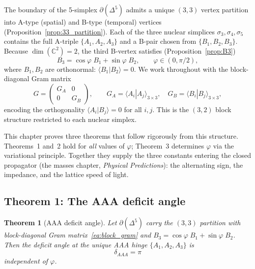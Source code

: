 \documentclass[12pt]{article}
\newtheorem{theorem}{Theorem}[section]
\theoremstyle{remark}
\theoremstyle{definition}
\newcommand{\CC}{\mathbb{C}}
\begin{document}
The boundary of the 5-simplex $\partial(\Delta^5)$ admits a unique
$(3,3)$ vertex partition into A-type (spatial) and B-type (temporal)
vertices (Proposition~\ref{prop:33_partition}).  Each of the three
nuclear simplices $\sigma_3, \sigma_4, \sigma_5$ contains the full
A-triple $\{A_1, A_2, A_3\}$ and a B-pair chosen from
$\{B_1, B_2, B_3\}$.  Because $\dim(\CC^2) = 2$, the third B-vertex
satisfies (Proposition~\ref{prop:B3})
\begin{equation}\label{eq:B3_parametrize}
B_3 = \cos\varphi\; B_1 + \sin\varphi\; B_2,
\qquad \varphi \in (0, \pi/2),
\end{equation}
where $B_1, B_2$ are orthonormal: $\langle B_1 | B_2 \rangle = 0$.
We work throughout with the block-diagonal Gram matrix
\begin{equation}\label{eq:block_gram}
G = \begin{pmatrix} G_A & 0 \\ 0 & G_B \end{pmatrix},
\qquad
G_A = \langle A_i | A_j \rangle_{3\times 3},
\quad
G_B = \langle B_i | B_j \rangle_{3\times 3},
\end{equation}
encoding the orthogonality $\langle A_i | B_j \rangle = 0$ for all
$i, j$.  This is the $(3,2)$ block structure restricted to each
nuclear simplex.

This chapter proves three theorems that follow rigorously from this
structure.  Theorems~1 and~2 hold for \emph{all} values of $\varphi$;
Theorem~3 determines $\varphi$ via the variational principle.
Together they supply the three constants entering the closed propagator
(the masses chapter, \textit{Physical Predictions}): the alternating sign, the impedance, and
the lattice speed of light.

\subsection{Theorem 1: The AAA deficit angle}
\label{sec:thm_AAA}

\begin{theorem}[AAA deficit angle]\label{thm:delta_AAA}
Let $\partial(\Delta^5)$ carry the $(3,3)$ partition with
block-diagonal Gram matrix~\eqref{eq:block_gram} and
$B_3 = \cos\varphi\; B_1 + \sin\varphi\; B_2$.  Then the deficit
angle at the unique AAA hinge $\{A_1, A_2, A_3\}$ is
\begin{equation}
\boxed{\delta_{AAA} = \pi}
\end{equation}
independent of $\varphi$.
\end{theorem}
\end{document}

